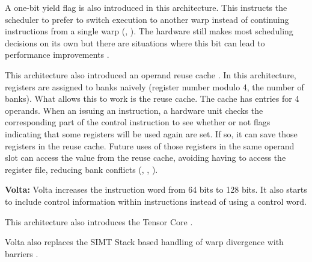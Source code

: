 A one-bit yield flag is also introduced in this architecture. This instructs
the scheduler to prefer to switch execution to another warp instead of continuing
instructions from a single warp (\cite{githubControlCodes}, \cite{jia2018dissecting}). 
The hardware still makes most scheduling decisions on its own but there are
situations where this bit can lead to performance improvements \cite{githubControlCodes}.

This architecture also introduced an operand reuse cache \cite{chipsandcheeseMaxwellNvidias}. 
In this architecture, registers are assigned to banks naively (register number modulo 4, the number of banks).
What allows this to work is the reuse cache. The cache has entries for 4 operands.
When an issuing an instruction, a hardware unit checks the corresponding part of the control instruction
to see whether or not flags indicating that some registers will be used again are set.
If so, it can save those registers in the reuse cache. Future uses of those
registers in the same operand slot can access the value from the reuse cache,
avoiding having to access the register file, reducing bank conflicts (\cite{jia2018dissecting}, \cite{githubSGEMM}, \cite{chipsandcheeseMaxwellNvidias}).

\textbf{Volta:} Volta increases the instruction word from 64 bits to 128 bits.
It also starts to include control information within instructions instead of
using a control word\cite{jia2018dissecting}.

This architecture also introduces the Tensor Core \cite{sun2022dissecting}.

Volta also replaces the SIMT Stack based handling of warp divergence with
barriers \cite{aamodt2018general}.
